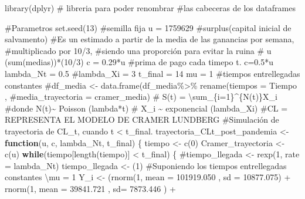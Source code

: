 \documentclass[
  us-letterpaper,
]{scrreprt}
\newenvironment{Shaded}{\begin{snugshade}}{\end{snugshade}}
\newcommand{\AttributeTok}[1]{\textcolor[rgb]{0.40,0.45,0.13}{#1}}
\newcommand{\CommentTok}[1]{\textcolor[rgb]{0.37,0.37,0.37}{#1}}
\newcommand{\ControlFlowTok}[1]{\textcolor[rgb]{0.00,0.23,0.31}{\textbf{#1}}}
\newcommand{\DecValTok}[1]{\textcolor[rgb]{0.68,0.00,0.00}{#1}}
\newcommand{\FloatTok}[1]{\textcolor[rgb]{0.68,0.00,0.00}{#1}}
\newcommand{\FunctionTok}[1]{\textcolor[rgb]{0.28,0.35,0.67}{#1}}
\newcommand{\NormalTok}[1]{\textcolor[rgb]{0.00,0.23,0.31}{#1}}
\newcommand{\OtherTok}[1]{\textcolor[rgb]{0.00,0.23,0.31}{#1}}
\newcommand{\SpecialCharTok}[1]{\textcolor[rgb]{0.37,0.37,0.37}{#1}}
\theoremstyle{definition}
\theoremstyle{plain}
\theoremstyle{plain}
\theoremstyle{remark}
\begin{document}
\begin{Shaded}
\begin{Highlighting}[]
\FunctionTok{library}\NormalTok{(dplyr) }\CommentTok{\# libreria para poder renombrar }
\CommentTok{\#las cabeceras de los dataframes}

\CommentTok{\#Parametros}
\FunctionTok{set.seed}\NormalTok{(}\DecValTok{13}\NormalTok{) }\CommentTok{\#semilla fija}
\NormalTok{u }\OtherTok{=} \DecValTok{1759629} \CommentTok{\#surplus(capital inicial de salvamento)}
\CommentTok{\#Es un estimado a partir de la media de las ganancias por semana, }
\CommentTok{\#multiplicado por 10/3, }
\CommentTok{\#siendo una proporción para evitar la ruina}
\CommentTok{\# u (sum(medias))*(10/3)}
\NormalTok{c }\OtherTok{=} \FloatTok{0.29}\SpecialCharTok{*}\NormalTok{u }\CommentTok{\#prima de pago cada timepo t. c=0.5*u}
\NormalTok{lambda\_Nt }\OtherTok{=} \FloatTok{0.5}
\CommentTok{\#lambda\_Xi = 3}
\NormalTok{t\_final }\OtherTok{=} \DecValTok{14}
\NormalTok{mu }\OtherTok{=} \DecValTok{1} \CommentTok{\#tiempos entrellegadas constantes}
\CommentTok{\#df\_media \textless{}{-} data.frame(df\_media\%\textgreater{}\% rename(tiempos = Tiempo , }
\CommentTok{\#media\_trayectoria = cramer\_media)}
\CommentTok{\# S(t) = \textbackslash{}sum\_\{i=1\}\^{}\{N(t)\}X\_i}
\CommentTok{\#donde N(t)\textasciitilde{} Poisson (lambda*t)}
\CommentTok{\# X\_i \textasciitilde{} exponencial (lambda\_Xi)}
\CommentTok{\#CL = REPRESENTA EL MODELO DE CRAMER LUNDBERG}
\CommentTok{\#Simulación de trayectoria de CL\_t, cuando t \textless{} t\_final.}
\NormalTok{trayectoria\_CLt\_post\_pandemia }\OtherTok{\textless{}{-}} \ControlFlowTok{function}\NormalTok{(u, c, lambda\_Nt, t\_final)}
\NormalTok{\{}
\NormalTok{  tiempo }\OtherTok{\textless{}{-}} \FunctionTok{c}\NormalTok{(}\DecValTok{0}\NormalTok{)}
\NormalTok{  Cramer\_trayectoria }\OtherTok{\textless{}{-}} \FunctionTok{c}\NormalTok{(u)}
  \ControlFlowTok{while}\NormalTok{(tiempo[}\FunctionTok{length}\NormalTok{(tiempo)] }\SpecialCharTok{\textless{}}\NormalTok{ t\_final)}
\NormalTok{  \{}
    \CommentTok{\#tiempo\_llegada \textless{}{-} rexp(1, rate = lambda\_Nt)}
\NormalTok{    tiempo\_llegada }\OtherTok{\textless{}{-}}\NormalTok{ (}\DecValTok{1}\NormalTok{) }
\CommentTok{\#Suponiendo los tiempos entrellegadas constantes \textbackslash{}mu = 1}
\NormalTok{    Y\_i }\OtherTok{\textless{}{-}}\NormalTok{  (}\FunctionTok{rnorm}\NormalTok{(}\DecValTok{1}\NormalTok{, }\AttributeTok{mean =} \FloatTok{101919.050}\NormalTok{ , }\AttributeTok{sd =} \FloatTok{10877.075}\NormalTok{)  }\SpecialCharTok{+}
               \FunctionTok{rnorm}\NormalTok{(}\DecValTok{1}\NormalTok{, }\AttributeTok{mean =}  \FloatTok{39841.721}\NormalTok{ , }\AttributeTok{sd=} \FloatTok{7873.446}\NormalTok{ ) }\SpecialCharTok{+} 

\end{Highlighting}
\end{Shaded}
\end{document}
